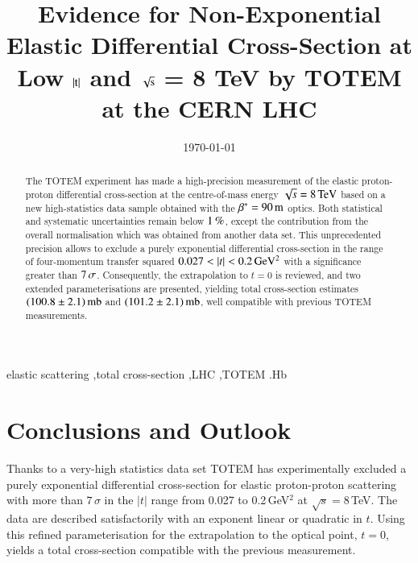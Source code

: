 \documentclass[3p,twocolumn]{elsarticle}
\def\un#1{\,{\rm #1}}
\begin{document}
\begin{frontmatter}

\title{Evidence for Non-Exponential Elastic Differential Cross-Section at Low $|\hbox{t}|$ and $\sqrt{\hbox{s}}$ = 8 TeV by TOTEM at the CERN LHC}



\date{\today}


\begin{abstract}
The TOTEM experiment has made a high-precision measurement of the elastic 
proton-proton differential cross-section at the centre-of-mass energy 
$\sqrt s = 8\un{TeV}$ based on a new high-statistics data sample obtained with 
the $\beta^* = 90\un{m}$ optics. 
Both statistical and systematic uncertainties remain below $1\un{\%}$, except 
the contribution from the overall normalisation which was obtained from 
another data set. This unprecedented precision allows to exclude a purely exponential differential cross-section in the range of four-momentum transfer squared $0.027 < |t| < 0.2\un{GeV^2}$ with a significance greater than $7\un{\sigma}$. Consequently, the extrapolation to $t=0$ is reviewed, and two extended parameterisations are presented, yielding total cross-section estimates $(100.8 \pm 2.1)\un{mb}$ and $(101.2 \pm 2.1)\un{mb}$, well compatible with previous TOTEM measurements.
\end{abstract}

\begin{keyword}
elastic scattering \sep total cross-section \sep LHC \sep TOTEM
.Hb %
\end{keyword}
\end{frontmatter}













\section{Conclusions and Outlook}
%
Thanks to a very-high statistics data set
TOTEM has experimentally excluded a purely exponential differential 
cross-section for elastic proton-proton scattering with more than $7\,\sigma$
in the $|t|$ range from 0.027 to 0.2\,GeV$^{2}$ at $\sqrt{s}=8\,$TeV. The data
are described satisfactorily with an exponent linear or quadratic in $t$.
Using this refined parameterisation for the extrapolation to the optical point,
$t = 0$, yields a total cross-section compatible with the previous measurement.
\end{document}
